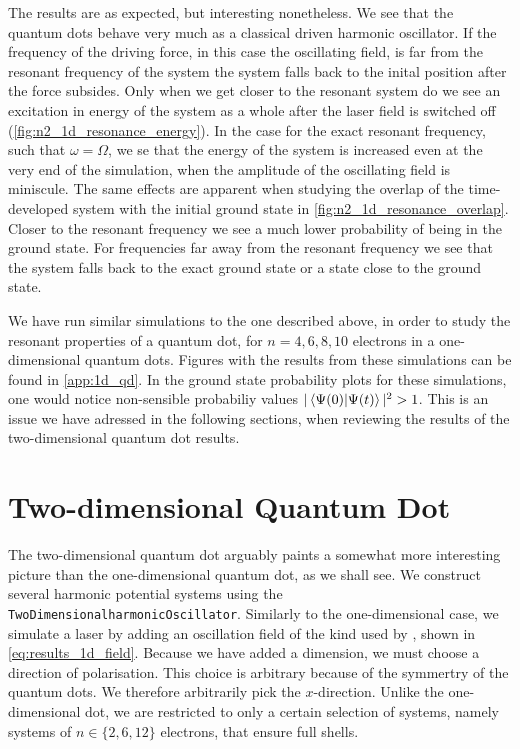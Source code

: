 The results are as expected, but interesting nonetheless. We see that the quantum dots 
behave very much as a classical driven harmonic oscillator. If the frequency of the driving
force, in this case the oscillating field, is far from the resonant frequency of the 
system the system falls back to the inital position after the force subsides. Only when we 
get closer to the resonant system do we see an excitation in energy of the system as 
a whole after the laser field is switched off (\autoref{fig:n2_1d_resonance_energy}).
In the case for the exact resonant frequency,
such that $\omega=\Omega$, we se that the energy of the system is increased even at the very 
end of the simulation, when the amplitude of the oscillating field is miniscule.
The same effects are apparent when studying the overlap of the time-developed system 
with the initial ground state in \autoref{fig:n2_1d_resonance_overlap}. Closer to the
resonant frequency we see a much lower probability of being in the ground state. For 
frequencies far away from the resonant frequency we see that the system falls back to 
the exact ground state or a state close to the ground state.

We have run similar simulations to the one described above, in order to study the 
resonant properties of a quantum dot, for $n=4,6,8,10$ electrons in a one-dimensional 
quantum dots. Figures with the results from these simulations can be found in 
\autoref{app:1d_qd}. In the ground state probability plots for these simulations, 
one would notice non-sensible probabiliy values $|\braket{\Psi(0)}{\Psi(t)}|^2 > 1$.
This is an issue we have adressed in the following sections, when reviewing the results 
of the two-dimensional quantum dot results.


\section{Two-dimensional Quantum Dot}

The two-dimensional quantum dot arguably paints a somewhat more interesting picture 
than the one-dimensional quantum dot, as we shall see. We construct several 
harmonic potential systems using the  \lstinline{TwoDimensionalharmonicOscillator}.
Similarly to the one-dimensional case, we simulate a laser by adding an 
oscillation field of the kind used by
\citeauthor{pedersen2019symplectic}\cite{pedersen2019symplectic}, shown 
in \autoref{eq:results_1d_field}. Because we have added a dimension, we must 
choose a direction of polarisation. This choice is arbitrary because of the 
symmertry of the quantum dots. We therefore arbitrarily pick the $x$-direction.
Unlike the one-dimensional dot, we are restricted to only a certain selection of 
systems, namely systems of $n\in\{2,6,12\}$ electrons, that ensure full shells.


